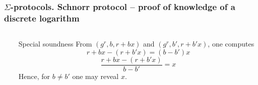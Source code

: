 \documentclass[aspectratio=169,handout]{beamer}
\begin{document}
\begin{frame}
  \frametitle{$\Sigma$-protocols. Schnorr protocol -- proof of knowledge of a discrete logarithm}
  \begin{columns}
    \begin{column}{.5\linewidth}
    \end{column}
    \begin{column}{.5\linewidth}
      \begin{block}{Special soundness}
        From $(g^r, b, r + bx)$ and $(g^r, b', r + b'x)$, one computes
        \[
          r + bx - (r + b'x)  = (b - b')x
        \]
        \[
          \frac{r + bx - (r + b'x)}{b - b'} = x
        \]
        Hence, for $b \neq b'$ one may reveal $x$.
      \end{block}
    \end{column}
  \end{columns}
\end{frame}
\end{document}
